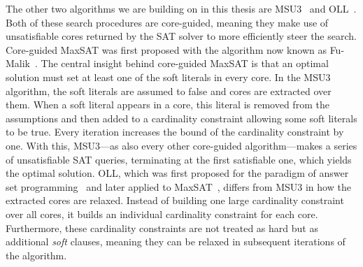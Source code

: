 The other two algorithms we are building on in this thesis are MSU3~\autocite{DBLP:journals/corr/abs-0712-1097} and OLL~\autocite{DBLP:conf/cp/MorgadoDM14,DBLP:journals/jsat/IgnatievMM19}.
Both of these search procedures are core-guided, meaning they make use of unsatisfiable cores returned by the SAT solver to more efficiently steer the search.
Core-guided MaxSAT was first proposed with the algorithm now known as Fu-Malik~\autocite{DBLP:conf/sat/FuM06}.
The central insight behind core-guided MaxSAT is that an optimal solution must set at least one of the soft literals in every core.
In the MSU3 algorithm, the soft literals are assumed to false and cores are extracted over them.
When a soft literal appears in a core, this literal is removed from the assumptions and then added to a cardinality constraint allowing some soft literals to be true.
Every iteration increases the bound of the cardinality constraint by one.
With this, MSU3---as also every other core-guided algorithm---makes a series of unsatisfiable SAT queries, terminating at the first satisfiable one, which yields the optimal solution.
OLL, which was first proposed for the paradigm of answer set programming~\autocite{DBLP:conf/iclp/AndresKMS12} and later applied to MaxSAT~\autocite{DBLP:conf/cp/MorgadoDM14,DBLP:journals/jsat/IgnatievMM19}, differs from MSU3 in how the extracted cores are relaxed.
Instead of building one large cardinality constraint over all cores, it builds an individual cardinality constraint for each core.
Furthermore, these cardinality constraints are not treated as hard but as additional \emph{soft} clauses, meaning they can be relaxed in subsequent iterations of the algorithm.